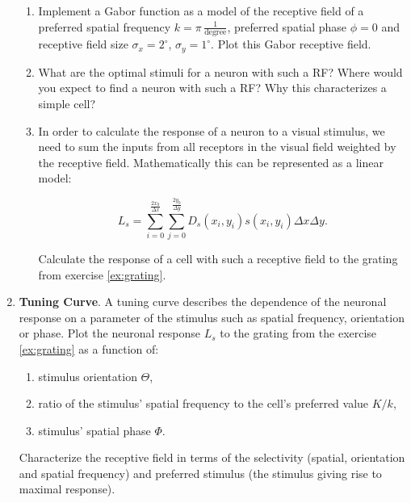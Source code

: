 \documentclass[12pt, a4]{article}
\begin{document}
\begin{enumerate}
        \begin{enumerate}
            \item \label{ex:Gabor}  Implement a Gabor function as a model of the
                receptive field of  a preferred
                spatial frequency $k=\pi\,\frac{1}{\mathrm{degree}}$,
                preferred spatial phase $\phi=0$
                and receptive field size $\sigma_x=2^\circ$,
                $\sigma_y=1^\circ$. Plot this Gabor receptive field.
                
            \item What are the optimal stimuli for a neuron with such a
                RF? Where would you expect to find a
                neuron with such a RF?  Why this characterizes a
                simple cell?
            \item In order to calculate the response of a neuron to a
                visual stimulus, we need to sum the inputs from all
                receptors in the visual field weighted by the
                receptive field. Mathematically this can be
                represented as a linear model:
                

                \begin{equation}
                    L_s = \sum_{i=0}^{\frac{2x_0}{\Delta x}}
                    \sum_{j=0}^{\frac{2y_0}{\Delta y}} D_s(x_i,y_i) s(x_i,y_i)
                    \Delta x \Delta y.
                    \label{eq:respons}
                \end{equation}
                
                Calculate the response of a cell with such a
                receptive field to the grating from exercise
                \ref{ex:grating}.
        \end{enumerate}

    \item \textbf{Tuning Curve}. A tuning curve describes the dependence of
        the neuronal response on a parameter of the stimulus such as
        spatial frequency, orientation or phase. Plot the neuronal
        response $L_s$ to the grating from the exercise \ref{ex:grating} as a 
        function of:

        \begin{enumerate}
            \item\label{ex:tuneorient} stimulus orientation $\Theta$,
            \item ratio of the stimulus' spatial frequency to the
                cell's preferred value $K/k$,
            \item\label{ex:tunephase} stimulus' spatial phase  $\Phi$.

        \end{enumerate}
        Characterize the receptive field in terms of the selectivity
        (spatial, orientation and spatial frequency) and preferred stimulus
        (the stimulus giving rise to maximal response). 

\end{enumerate}
\end{document}

